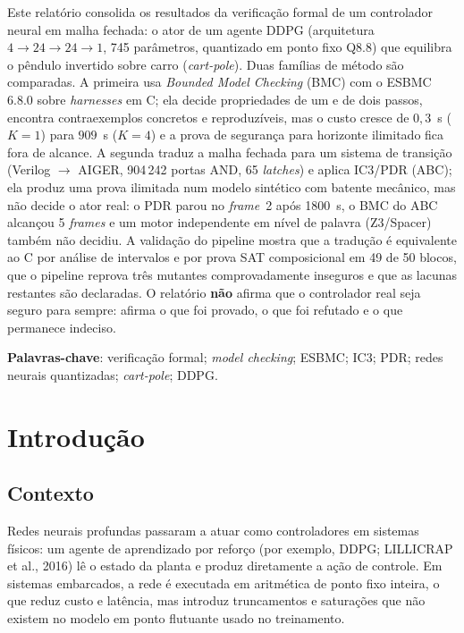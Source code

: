 \documentclass[12pt,openright,oneside,a4paper,chapter=TITLE,sumario=tradicional,english,brazil]{abntex2}
\begin{document}
\begin{resumo}
Este relatório consolida os resultados da verificação formal de um controlador neural em malha fechada: o ator de um agente DDPG (arquitetura $4{\to}24{\to}24{\to}1$, 745 parâmetros, quantizado em ponto fixo Q8.8) que equilibra o pêndulo invertido sobre carro (\emph{cart-pole}). Duas famílias de método são comparadas. A primeira usa \emph{Bounded Model Checking} (BMC) com o ESBMC 6.8.0 sobre \emph{harnesses} em C; ela decide propriedades de um e de dois passos, encontra contraexemplos concretos e reproduzíveis, mas o custo cresce de $0{,}3$~s ($K{=}1$) para $909$~s ($K{=}4$) e a prova de segurança para horizonte ilimitado fica fora de alcance. A segunda traduz a malha fechada para um sistema de transição (Verilog $\to$ AIGER, 904\,242 portas AND, 65 \emph{latches}) e aplica IC3/PDR (ABC); ela produz uma prova ilimitada num modelo sintético com batente mecânico, mas não decide o ator real: o PDR parou no \emph{frame}~2 após 1800~s, o BMC do ABC alcançou 5 \emph{frames} e um motor independente em nível de palavra (Z3/Spacer) também não decidiu. A validação do pipeline mostra que a tradução é equivalente ao C por análise de intervalos e por prova SAT composicional em 49 de 50 blocos, que o pipeline reprova três mutantes comprovadamente inseguros e que as lacunas restantes são declaradas. O relatório \textbf{não} afirma que o controlador real seja seguro para sempre: afirma o que foi provado, o que foi refutado e o que permanece indeciso.

\vspace{\onelineskip}
\noindent\textbf{Palavras-chave}: verificação formal; \emph{model checking}; ESBMC; IC3; PDR; redes neurais quantizadas; \emph{cart-pole}; DDPG.
\end{resumo}

\tableofcontents*
\cleardoublepage
\listoffigures*
\cleardoublepage
\listoftables*
\cleardoublepage

\textual

\chapter{Introdução}

\section{Contexto}

Redes neurais profundas passaram a atuar como controladores em sistemas físicos: um agente de aprendizado por reforço (por exemplo, DDPG; LILLICRAP et al., 2016) lê o estado da planta e produz diretamente a ação de controle. Em sistemas embarcados, a rede é executada em aritmética de ponto fixo inteira, o que reduz custo e latência, mas introduz truncamentos e saturações que não existem no modelo em ponto flutuante usado no treinamento.
\end{document}
